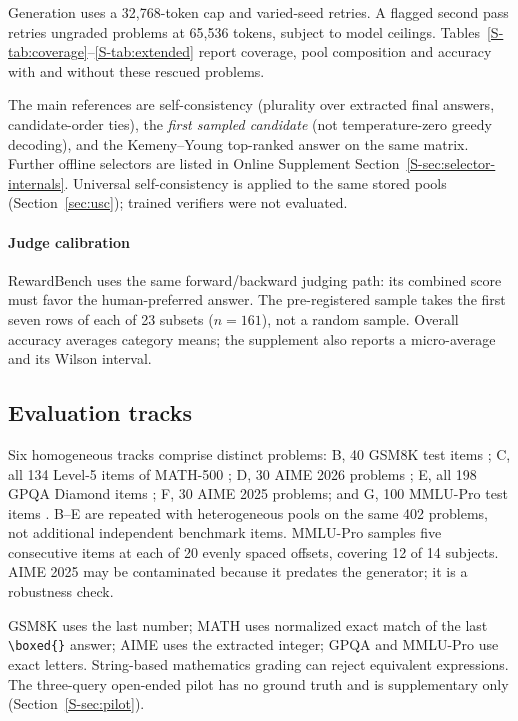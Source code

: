 \documentclass[preprint,11pt,number,sort&compress]{elsarticle}
\begin{document}
Generation uses a 32{,}768-token cap and varied-seed retries. A flagged
second pass retries ungraded problems at 65{,}536 tokens, subject to model
ceilings. Tables~\ref{S-tab:coverage}--\ref{S-tab:extended} report coverage,
pool composition and accuracy with and without these rescued problems.

The main references are self-consistency (plurality over extracted final
answers, candidate-order ties), the \emph{first sampled candidate} (not
temperature-zero greedy decoding), and the Kemeny--Young top-ranked answer
on the same matrix. Further offline selectors are listed in
Online Supplement Section~\ref{S-sec:selector-internals}. Universal
self-consistency is applied to the same stored pools (Section~\ref{sec:usc}); trained verifiers
were not evaluated.

\paragraph{Judge calibration}
\label{sec:rewardbench-setup}

RewardBench \citep{rewardbench2025} uses the same forward/backward judging
path: its combined score must favor the human-preferred answer. The
pre-registered sample takes the first seven rows of each of 23 subsets
($n=161$), not a random sample. Overall accuracy averages category means;
the supplement also reports a micro-average and its Wilson interval.

\subsection{Evaluation tracks}
\label{sec:tracks}

Six homogeneous tracks comprise \TotalProblems{} distinct problems:
B, 40 GSM8K test items \citep{cobbe2021gsm8k}; C, all 134 Level-5 items
of MATH-500 \citep{hendrycks2021math,lightman2023letsverify}; D, 30 AIME
2026 problems \citep{matharena2025aime}; E, all 198 GPQA Diamond items
\citep{rein2024gpqa}; F, 30 AIME 2025 problems; and G, 100 MMLU-Pro test
items \citep{wang2024mmlupro}. B--E are repeated with heterogeneous pools
on the same 402 problems, not additional independent benchmark items.
MMLU-Pro samples five consecutive items at each of 20 evenly spaced
offsets, covering 12 of 14 subjects. AIME 2025 may be contaminated because
it predates the generator; it is a robustness check.

GSM8K uses the last number; MATH uses normalized exact match of the last
\texttt{\textbackslash boxed\{\}} answer; AIME uses the extracted integer;
GPQA and MMLU-Pro use exact letters. String-based mathematics grading can
reject equivalent expressions. The three-query open-ended pilot has no
ground truth and is supplementary only (Section~\ref{S-sec:pilot}).
\end{document}

